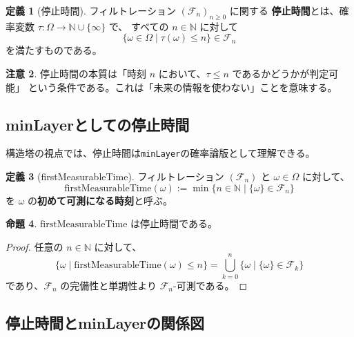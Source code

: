 \documentclass[a4paper,12pt]{ltjsarticle}
\theoremstyle{definition}
\newtheorem{definition}{定義}[section]
\newtheorem{proposition}[definition]{命題}
\newtheorem{remark}[definition]{注意}
\begin{document}
\begin{definition}[停止時間]
フィルトレーション $(\mathcal{F}_n)_{n \geq 0}$ に関する
\textbf{停止時間}とは、確率変数 $\tau: \Omega \to \mathbb{N} \cup \{\infty\}$ で、
すべての $n \in \mathbb{N}$ に対して
\[
  \{\omega \in \Omega \mid \tau(\omega) \leq n\} \in \mathcal{F}_n
\]
を満たすものである。
\end{definition}

\begin{remark}
停止時間の本質は「時刻 $n$ において、$\tau \leq n$ であるかどうかが判定可能」
という条件である。これは「未来の情報を使わない」ことを意味する。
\end{remark}

\subsection{minLayerとしての停止時間}

構造塔の視点では、停止時間は\texttt{minLayer}の確率論版として理解できる。

\begin{definition}[firstMeasurableTime]
フィルトレーション $(\mathcal{F}_n)$ と $\omega \in \Omega$ に対して、
\[
  \mathrm{firstMeasurableTime}(\omega)
  := \min\{n \in \mathbb{N} \mid \{\omega\} \in \mathcal{F}_n\}
\]
を $\omega$ の\textbf{初めて可測になる時刻}と呼ぶ。
\end{definition}

\begin{proposition}
$\mathrm{firstMeasurableTime}$ は停止時間である。
\end{proposition}

\begin{proof}
任意の $n \in \mathbb{N}$ に対して、
\[
  \{\omega \mid \mathrm{firstMeasurableTime}(\omega) \leq n\}
  = \bigcup_{k=0}^n \{\omega \mid \{\omega\} \in \mathcal{F}_k\}
\]
であり、$\mathcal{F}_n$ の完備性と単調性より $\mathcal{F}_n$-可測である。
\end{proof}

\subsection{停止時間とminLayerの関係図}
\end{document}
